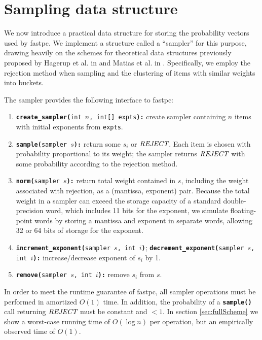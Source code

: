 \documentclass[11pt]{article}
\newcommand{\func}[1]{{\bf\texttt{#1}}}
\newcommand{\args}[1]{\texttt{#1}}
\newcommand{\reject}{\emph{REJECT} }
\begin{document}
      
\section{Sampling data structure} \label{sec:sampler}
We now introduce a practical data structure for storing the probability vectors used by fastpc.
We implement a structure
called a ``sampler'' for this purpose, drawing heavily on the schemes for 
theoretical data structures previously proposed  by Hagerup et al. in 
\cite{hagerup1993} and Matias et al. in \cite{matias1993}. Specifically, we
employ the rejection method when sampling and the clustering of items with
similar weights into buckets.  

The sampler provides the following interface to fastpc: 
\begin{enumerate}
\item \func{create\_sampler(}\args{int $n$, int[] expts}\func{):} create 
  sampler containing $n$ items with initial exponents from
  \args{expts}.

\item \func{sample(}\args{sampler $s$}\func{):} return some $s_i$ or
  $\reject$.  Each item is chosen with probability
    proportional to its weight; the sampler returns $\reject$ with some
    probability according to the rejection method.

\item \func{norm(}\args{sampler $s$}\func{):} return total
  weight contained in $s$, including the weight associated with rejection, as a
  (mantissa, exponent) pair. Because the total
    weight in a sampler can exceed the storage capacity of a standard
    double-precision word, which includes 11 bits for the exponent, we
    simulate floating-point words by storing a mantissa and exponent in
    separate words, allowing 32 or 64 bits of storage for the exponent.

\item \func{increment\_exponent(}\args{sampler $s$, int
    $i$}\func{)};
    \func{decrement\_exponent(}\args{sampler $s$, int
    $i$}\func{):} increase/decrease exponent of $s_i$ by 1.  

\item \func{remove(}\args{sampler $s$, int $i$}\func{):} remove $s_i$ from
  $s$. 
  
\end{enumerate}

In order to meet the runtime guarantee of fastpc, all sampler operations must
be performed in amortized $O(1)$ time.  In addition, the probability of a
\func{sample()} call returning $\reject$ must be constant and $< 1$.  In section \ref{sec:fullScheme} we show a
worst-case running time of $O(\log n)$ per operation, but an empirically 
observed time of $O(1)$.
\end{document}
